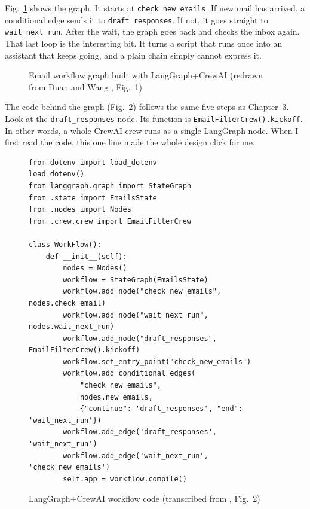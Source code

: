 \documentclass[12pt,a4paper]{report}
\begin{document}
Fig.~\ref{fig:email} shows the graph. It starts at \texttt{check\_new\_emails}. If new mail has arrived, a conditional edge sends it to \texttt{draft\_responses}. If not, it goes straight to \texttt{wait\_next\_run}. After the wait, the graph goes back and checks the inbox again. That last loop is the interesting bit. It turns a script that runs once into an assistant that keeps going, and a plain chain simply cannot express it.

\begin{figure}[H]
\centering
{}
\caption{Email workflow graph built with LangGraph+CrewAI (redrawn from Duan and Wang \cite{duan2024langgraphcrewai}, Fig.~1)}
\label{fig:email}
\end{figure}

The code behind the graph (Fig.~\ref{fig:code}) follows the same five steps as Chapter~3. Look at the \texttt{draft\_responses} node. Its function is \texttt{EmailFilterCrew().kickoff}. In other words, a whole CrewAI crew runs as a single LangGraph node. When I first read the code, this one line made the whole design click for me.

\begin{figure}[H]
\begin{lstlisting}
from dotenv import load_dotenv
load_dotenv()
from langgraph.graph import StateGraph
from .state import EmailsState
from .nodes import Nodes
from .crew.crew import EmailFilterCrew

class WorkFlow():
    def __init__(self):
        nodes = Nodes()
        workflow = StateGraph(EmailsState)
        workflow.add_node("check_new_emails", nodes.check_email)
        workflow.add_node("wait_next_run", nodes.wait_next_run)
        workflow.add_node("draft_responses", EmailFilterCrew().kickoff)
        workflow.set_entry_point("check_new_emails")
        workflow.add_conditional_edges(
            "check_new_emails",
            nodes.new_emails,
            {"continue": 'draft_responses', "end": 'wait_next_run'})
        workflow.add_edge('draft_responses', 'wait_next_run')
        workflow.add_edge('wait_next_run', 'check_new_emails')
        self.app = workflow.compile()
\end{lstlisting}
\caption{LangGraph+CrewAI workflow code (transcribed from \cite{duan2024langgraphcrewai}, Fig.~2)}
\label{fig:code}
\end{figure}
\end{document}
